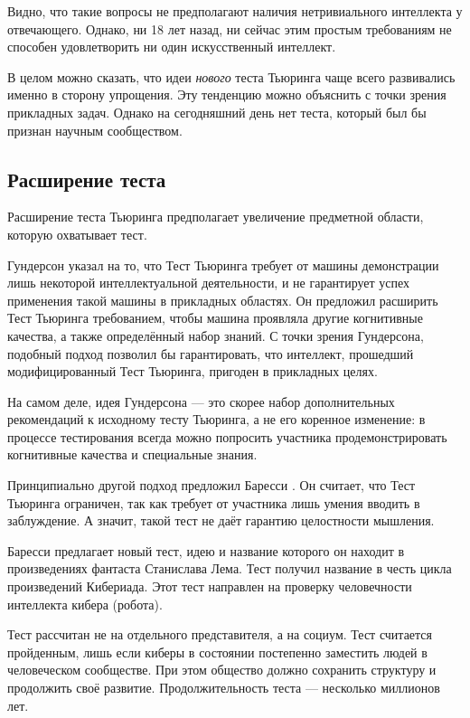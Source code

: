 \documentclass[a4paper,14pt]{scrartcl}
\begin{document}
Видно, что такие вопросы не предполагают наличия нетривиального интеллекта у отвечающего. Однако, ни 18 лет назад, ни сейчас этим простым требованиям не способен удовлетворить ни один искусственный интеллект.

В целом можно сказать, что идеи {\it нового} теста Тьюринга чаще всего развивались именно в сторону упрощения. Эту тенденцию можно объяснить с точки зрения прикладных задач. Однако на сегодняшний день нет теста, который был бы признан научным сообществом.

\subsection{Расширение теста}

Расширение теста Тьюринга предполагает увеличение предметной области, которую охватывает тест. 

Гундерсон \cite{gunderson_1985} указал на то, что Тест Тьюринга требует от машины демонстрации лишь некоторой интеллектуальной деятельности, и не гарантирует успех применения такой машины в прикладных областях. Он предложил расширить Тест Тьюринга требованием, чтобы машина проявляла другие когнитивные качества, а также определённый набор знаний. С точки зрения Гундерсона, подобный подход позволил бы гарантировать, что интеллект, прошедший модифицированный Тест Тьюринга, пригоден в прикладных целях.

На самом деле, идея Гундерсона --- это скорее набор дополнительных рекомендаций к исходному тесту Тьюринга, а не его коренное изменение: в процессе тестирования всегда можно попросить участника продемонстрировать когнитивные качества и специальные знания. 

Принципиально другой подход предложил Баресси \cite{barresi_1987}. Он считает, что Тест Тьюринга ограничен, так как требует от участника лишь умения вводить в заблуждение. А значит, такой тест не даёт гарантию целостности мышления. 

Баресси предлагает новый тест, идею и название которого он находит в произведениях фантаста Станислава Лема. Тест получил название в честь цикла произведений Кибериада. Этот тест направлен на проверку человечности интеллекта кибера (робота).

Тест рассчитан не на отдельного представителя, а на социум. Тест считается пройденным, лишь если киберы в состоянии постепенно заместить людей в человеческом сообществе. При этом общество должно сохранить структуру и продолжить своё развитие. Продолжительность теста — несколько миллионов лет.
\end{document}
